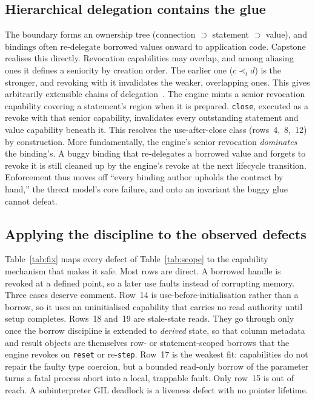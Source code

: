 \documentclass[10pt,twocolumn]{article}
\begin{document}
\subsection{Hierarchical delegation contains the glue}
The boundary forms an ownership tree (connection $\supset$ statement $\supset$
value), and bindings often re-delegate borrowed values onward to application
code. Capstone realises this directly. Revocation capabilities may overlap, and
among aliasing ones it defines a seniority by creation order. The earlier one
($c \prec_t d$) is the stronger, and revoking with it invalidates the weaker,
overlapping ones. This gives arbitrarily extensible chains of
delegation~\cite{capstonespec}. The engine mints a senior revocation capability
covering a statement's region when it is prepared. \texttt{close}, executed as
a revoke with that senior capability, invalidates every outstanding statement
and value capability beneath it. This resolves the use-after-close class
(rows~4,~8,~12) by construction. More fundamentally, the engine's senior
revocation \emph{dominates} the binding's. A buggy binding that re-delegates a
borrowed value and forgets to revoke it is still cleaned up by the engine's
revoke at the next lifecycle transition. Enforcement thus moves off ``every
binding author upholds the contract by hand,'' the threat model's core failure,
and onto an invariant the buggy glue cannot defeat.

\subsection{Applying the discipline to the observed defects}
Table~\ref{tab:fix} maps every defect of Table~\ref{tab:scope} to the capability
mechanism that makes it safe. Most rows are direct. A borrowed handle is revoked
at a defined point, so a later use faults instead of corrupting memory. Three
cases deserve comment. Row~14 is use-before-initialisation rather than a borrow,
so it uses an uninitialised capability that carries no read authority until
setup completes. Rows~18 and~19 are stale-state reads. They go through only once
the borrow discipline is extended to \emph{derived} state, so that column
metadata and result objects are themselves row- or statement-scoped borrows that
the engine revokes on \texttt{reset} or re-\texttt{step}. Row~17 is the weakest
fit: capabilities do not repair the faulty type coercion, but a bounded
read-only borrow of the parameter turns a fatal process abort into a local,
trappable fault. Only row~15 is out of reach. A subinterpreter GIL deadlock is a
liveness defect with no pointer lifetime.
\end{document}

